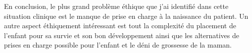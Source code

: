 En conclusion, le plus grand problème éthique que j’ai identifié dans cette situation clinique est le manque de prise en charge à la naissance du patient. Un autre aspect éthiquement intéressant est tout la complexité du placement de l’enfant pour sa survie et son bon développement ainsi que les alternatives de prises en charge possible pour l’enfant et le déni de grossesse de la maman.\\
